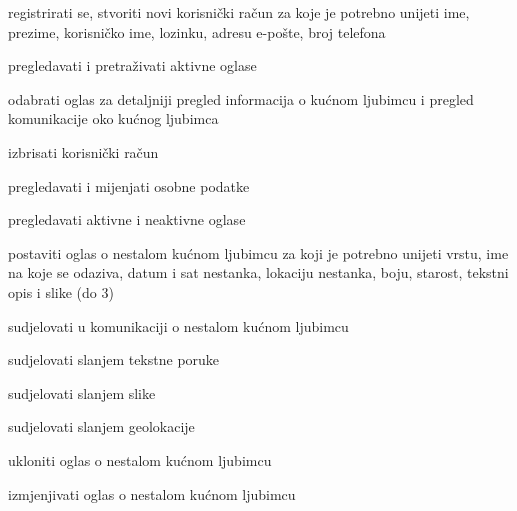 \begin{packed_enum}
	\item  {}
	
	\begin{packed_enum}
		
		\item registrirati se, stvoriti novi korisnički račun za koje je potrebno unijeti ime, prezime, korisničko ime, lozinku, adresu e-pošte, broj telefona
		\item pregledavati i pretraživati aktivne oglase
		\item odabrati oglas za detaljniji pregled informacija o kućnom ljubimcu i pregled komunikacije oko kućnog ljubimca
		
		
	\end{packed_enum}
	
	\item  {}
	
	\begin{packed_enum}
		
		\item izbrisati korisnički račun
		\item pregledavati i mijenjati osobne podatke
		\item pregledavati aktivne i neaktivne oglase
		\item postaviti oglas o nestalom kućnom ljubimcu za koji je potrebno unijeti vrstu, ime na koje se odaziva, datum i sat nestanka, lokaciju nestanka, boju, starost, tekstni opis i slike (do 3)
		\item sudjelovati u komunikaciji o nestalom kućnom ljubimcu
		\begin{packed_enum}
			
			\item sudjelovati slanjem tekstne poruke
			\item sudjelovati slanjem slike
			\item sudjelovati slanjem geolokacije
			
		\end{packed_enum}
		\item ukloniti oglas o nestalom kućnom ljubimcu
		\item izmjenjivati oglas o nestalom kućnom ljubimcu
		
		
	\end{packed_enum}
	
	\item  {}
	

\end{packed_enum}
